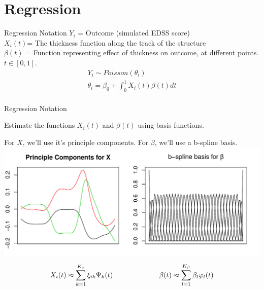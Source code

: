 \documentclass[9 pt]{beamer}
\newcommand{\es}[1]{\begin{equation*}\begin{split} #1 \end{split} \end{equation*}}
\begin{document}
\begin{frame}
\begin{figure}[ht]
\begin{minipage}[b]{0.45\linewidth}
\end{minipage}
\end{figure}
\end{frame}


\section*{Regression}
\begin{frame}{Regression Notation}
$Y_i$ = Outcome (simulated EDSS score) \\
$X_i(t)$= The thickness function along the track of the structure \\
$\beta(t)$ = Function representing effect of thickness on outcome, at different points.\\
$t \in [0,1]$.\\
\es{
Y_i \sim Poisson(\theta_i)\\
\theta_i =\beta_0 + \int_0^1 X_i(t)\beta(t) dt \\
}

\end{frame}



\begin{frame}{Regression Notation}

Estimate the functions $X_i(t)$ and $\beta(t)$ using basis functions.\

For $X$, we'll use it's principle components. For $\beta$, we'll use a b-spline basis.
\includegraphics[scale=.5]{pics/Figure_Basis.pdf}
\es{
X_i(t) \approx \sum_{k=1}^{K_x} \xi_{ik} \Psi_k(t) \hspace{2.3cm} \beta(t) \approx \sum_{l=1}^{K_\beta} \beta_l \varphi_l(t)
}
\end{frame}
\end{document}
